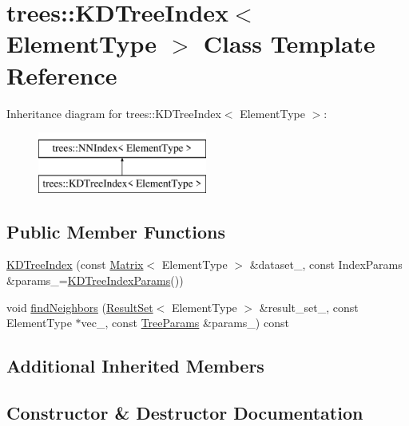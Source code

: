 \hypertarget{classtrees_1_1_k_d_tree_index}{}\section{trees\+:\+:K\+D\+Tree\+Index$<$ Element\+Type $>$ Class Template Reference}
\label{classtrees_1_1_k_d_tree_index}
Inheritance diagram for trees\+:\+:K\+D\+Tree\+Index$<$ Element\+Type $>$\+:\begin{figure}[H]
\begin{center}
\leavevmode
\includegraphics[height=2.000000cm]{classtrees_1_1_k_d_tree_index}
\end{center}
\end{figure}
\subsection*{Public Member Functions}
\begin{DoxyCompactItemize}
\item 
\hyperlink{classtrees_1_1_k_d_tree_index_abfde9fe47fe77c9fdde1af8d500b85e5}{K\+D\+Tree\+Index} (const \hyperlink{classtrees_1_1_matrix}{Matrix}$<$ Element\+Type $>$ \&dataset\+\_\+, const Index\+Params \&params\+\_\+=\hyperlink{structtrees_1_1_k_d_tree_index_params}{K\+D\+Tree\+Index\+Params}())
\item 
void \hyperlink{classtrees_1_1_k_d_tree_index_a37e551977e3c3f772846040819a12e8f}{find\+Neighbors} (\hyperlink{classtrees_1_1_result_set}{Result\+Set}$<$ Element\+Type $>$ \&result\+\_\+set\+\_\+, const Element\+Type $\ast$vec\+\_\+, const \hyperlink{structtrees_1_1_tree_params}{Tree\+Params} \&params\+\_\+) const
\end{DoxyCompactItemize}
\subsection*{Additional Inherited Members}


\subsection{Constructor \& Destructor Documentation}
\mbox{\label{classtrees_1_1_k_d_tree_index_abfde9fe47fe77c9fdde1af8d500b85e5}} 
